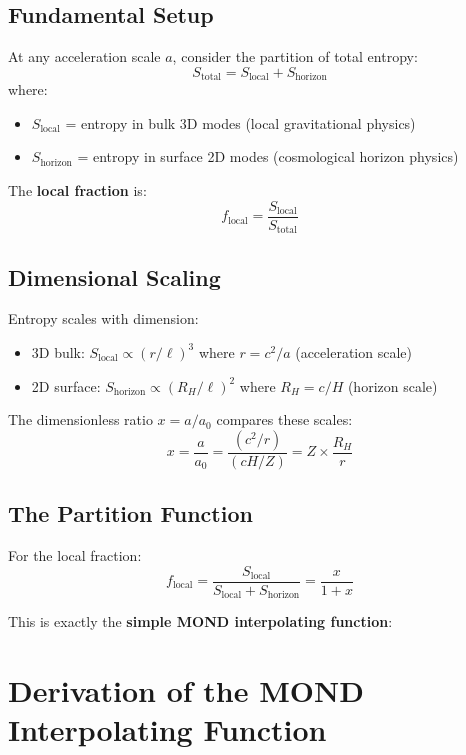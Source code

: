 \documentclass[11pt,a4paper]{article}
\theoremstyle{plain}
\theoremstyle{definition}
\theoremstyle{remark}
\begin{document}
\subsection{Fundamental Setup}

At any acceleration scale $a$, consider the partition of total entropy:
\[
S_{\text{total}} = S_{\text{local}} + S_{\text{horizon}}
\]
where:
\begin{itemize}
  \item $S_{\text{local}}$ = entropy in bulk 3D modes (local gravitational physics)
  \item $S_{\text{horizon}}$ = entropy in surface 2D modes (cosmological horizon physics)
\end{itemize}

The \textbf{local fraction} is:
\[
f_{\text{local}} = \frac{S_{\text{local}}}{S_{\text{total}}}
\]

\subsection{Dimensional Scaling}

Entropy scales with dimension:
\begin{itemize}
  \item 3D bulk: $S_{\text{local}} \propto (r/\ell)^3$ where $r = c^2/a$ (acceleration scale)
  \item 2D surface: $S_{\text{horizon}} \propto (R_H/\ell)^2$ where $R_H = c/H$ (horizon scale)
\end{itemize}

The dimensionless ratio $x = a/a_0$ compares these scales:
\[
x = \frac{a}{a_0} = \frac{(c^2/r)}{(cH/Z)} = Z \times \frac{R_H}{r}
\]

\subsection{The Partition Function}

For the local fraction:
\[
f_{\text{local}} = \frac{S_{\text{local}}}{S_{\text{local}} + S_{\text{horizon}}} = \frac{x}{1 + x}
\]

This is exactly the \textbf{simple MOND interpolating function}:

\begin{center}
\end{center}

\section{Derivation of the MOND Interpolating Function}
\end{document}
